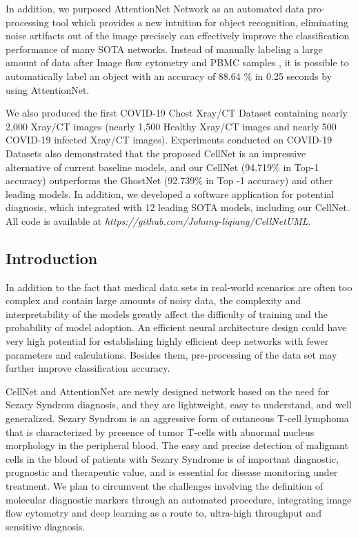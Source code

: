 In addition, we purposed AttentionNet Network as an automated data pro-processing tool which provides a new intuition for object recognition, eliminating noise artifacts out of the image precisely can effectively improve the classification performance of many SOTA networks. Instead of manually labeling a large amount of data after Image flow cytometry and PBMC samples \cite{b12}, it is possible to automatically label an object with an accuracy of 88.64 \% in 0.25 seconds by using AttentionNet. 

We also produced the first COVID-19 Chest Xray/CT Dataset containing nearly 2,000 Xray/CT images (nearly 1,500 Healthy Xray/CT images and nearly 500 COVID-19 infected Xray/CT images). Experiments conducted on COVID-19 Datasets also demonstrated that the proposed CellNet is an impressive alternative of current baseline models, and our CellNet (94.719\% in Top-1 accuracy) outperforms the GhostNet\cite{b19} (92.739\%  in Top -1 accuracy) and other leading models. In addition, we developed a software application for potential diagnosis, which integrated with 12 leading SOTA models, including our CellNet. All code is available at \textit{https://github.com/Johnny-liqiang/CellNetUML}.

\subsection{Introduction}
\label{sec:Introduction}
In addition to the fact that medical data sets in real-world scenarios are often too complex and contain large amounts of noisy data, the complexity and interpretability of the models greatly affect the difficulty of training and the probability of model adoption.
An efficient neural architecture design could have very high potential for establishing highly efficient deep networks with fewer parameters and calculations\cite{b19}. Besides them, pre-processing of the data set may further improve classification accuracy.
 
CellNet and AttentionNet are newly designed network based on the need for Sezary Syndrom diagnosis, and they are lightweight, easy to understand, and well generalized. Sezary Syndrom is an aggressive form of cutaneous T-cell lymphoma that is characterized by presence of tumor T-cells with abnormal nucleus morphology in the peripheral blood. The easy and precise detection of malignant cells in the blood of patients with Sezary Syndrome is of important diagnostic, prognostic and therapeutic value, and is essential for disease monitoring under treatment\cite{b6}\cite{b7}. We plan to circumvent the challenges involving the definition of molecular diagnostic markers through an automated procedure, integrating image flow cytometry and deep learning as a route to, ultra-high throughput and sensitive diagnosis.

